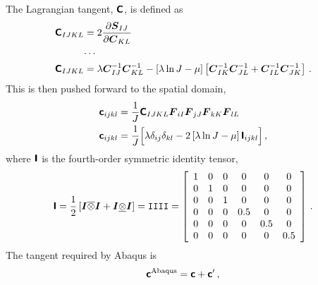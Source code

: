 \documentclass[10pt,letterpaper,oneside]{report}
\newcommand{\ten}[1]{\mbox{\boldmath $#1$}{}}
\newcommand{\tenf}[1]{\mbox{{\sffamily{\bfseries {#1}}}}}
\newcommand{\scas}[1]{\mbox{{\scriptsize{${\rm{#1}}$}}}{}}
\begin{document}
The Lagrangian tangent, $\tenf{C}$, is defined as
\begin{align}
\tenf{C}_{IJKL} ={}& 2 \frac{\partial \ten{S}_{IJ} }{\partial \ten{C}_{KL} }  
\\
\cdots{}& \notag \\
\tenf{C}_{IJKL} ={}& \lambda \ten{C}^{-1}_{IJ} \ten{C}^{-1}_{KL} - \left[ \lambda \ln J - \mu \right] \left[ \ten{C}^{-1}_{IK} \ten{C}^{-1}_{JL} + \ten{C}^{-1}_{IL} \ten{C}^{-1}_{JK} \right]  \, . 
\end{align}
This is then pushed forward to the spatial domain, 
\begin{align}
\tenf{c}_{ijkl} ={}& \frac{1}{J} \tenf{C}_{IJKL} \ten{F}_{iI} \ten{F}_{jJ} \ten{F}_{kK} \ten{F}_{lL} 
\\
\tenf{c}_{ijkl} ={}& \frac{1}{J} \Big[ \lambda \delta_{ij} \delta_{kl} - 2 \left[ \lambda \ln J - \mu \right] \tenf{I}_{ijkl} \Big] \, , 
\end{align}
where $\tenf{I}$ is the fourth-order symmetric identity tensor,
\begin{equation}
\tenf{I} 
= \frac{1}{2} \left[ \ten{I} \overline{\otimes} \ten{I} + \ten{I} \underline{\otimes} \ten{I} \right] 
= \mathtt{IIII} 
= \left[ \begin{array}{cccccc}
1 & 0 & 0 & 0   & 0   & 0 \\
0 & 1 & 0 & 0   & 0   & 0 \\
0 & 0 & 1 & 0   & 0   & 0 \\
0 & 0 & 0 & 0.5 & 0   & 0 \\
0 & 0 & 0 & 0   & 0.5 & 0 \\
0 & 0 & 0 & 0   & 0   & 0.5 \\
\end{array} \right] \, . 
\end{equation}
The tangent required by Abaqus is
\begin{equation}
\tenf{c}^{\scas{Abaqus}} = \tenf{c} + \tenf{c}' \, , 
\end{equation}
\end{document}
